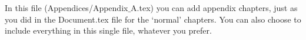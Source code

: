 In this file (Appendices/Appendix$\_$A.tex) you can add appendix chapters, just as you did in the Document.tex file for the `normal' chapters.
You can also choose to include everything in this single file, whatever you prefer.